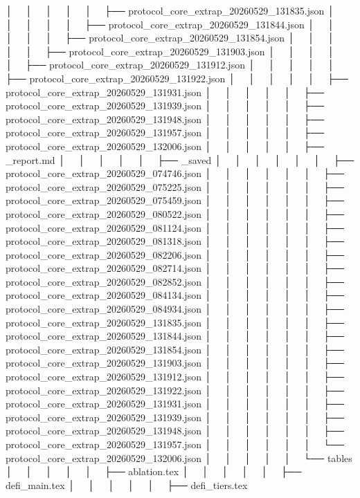 │   │       │   │   │   ├── protocol_core_extrap_20260529_131835.json
│   │       │   │   │   ├── protocol_core_extrap_20260529_131844.json
│   │       │   │   │   ├── protocol_core_extrap_20260529_131854.json
│   │       │   │   │   ├── protocol_core_extrap_20260529_131903.json
│   │       │   │   │   ├── protocol_core_extrap_20260529_131912.json
│   │       │   │   │   ├── protocol_core_extrap_20260529_131922.json
│   │       │   │   │   ├── protocol_core_extrap_20260529_131931.json
│   │       │   │   │   ├── protocol_core_extrap_20260529_131939.json
│   │       │   │   │   ├── protocol_core_extrap_20260529_131948.json
│   │       │   │   │   ├── protocol_core_extrap_20260529_131957.json
│   │       │   │   │   ├── protocol_core_extrap_20260529_132006.json
│   │       │   │   │   ├── _report.md
│   │       │   │   │   ├── _saved
│   │       │   │   │   │   ├── protocol_core_extrap_20260529_074746.json
│   │       │   │   │   │   ├── protocol_core_extrap_20260529_075225.json
│   │       │   │   │   │   ├── protocol_core_extrap_20260529_075459.json
│   │       │   │   │   │   ├── protocol_core_extrap_20260529_080522.json
│   │       │   │   │   │   ├── protocol_core_extrap_20260529_081124.json
│   │       │   │   │   │   ├── protocol_core_extrap_20260529_081318.json
│   │       │   │   │   │   ├── protocol_core_extrap_20260529_082206.json
│   │       │   │   │   │   ├── protocol_core_extrap_20260529_082714.json
│   │       │   │   │   │   ├── protocol_core_extrap_20260529_082852.json
│   │       │   │   │   │   ├── protocol_core_extrap_20260529_084134.json
│   │       │   │   │   │   ├── protocol_core_extrap_20260529_084934.json
│   │       │   │   │   │   ├── protocol_core_extrap_20260529_131835.json
│   │       │   │   │   │   ├── protocol_core_extrap_20260529_131844.json
│   │       │   │   │   │   ├── protocol_core_extrap_20260529_131854.json
│   │       │   │   │   │   ├── protocol_core_extrap_20260529_131903.json
│   │       │   │   │   │   ├── protocol_core_extrap_20260529_131912.json
│   │       │   │   │   │   ├── protocol_core_extrap_20260529_131922.json
│   │       │   │   │   │   ├── protocol_core_extrap_20260529_131931.json
│   │       │   │   │   │   ├── protocol_core_extrap_20260529_131939.json
│   │       │   │   │   │   ├── protocol_core_extrap_20260529_131948.json
│   │       │   │   │   │   ├── protocol_core_extrap_20260529_131957.json
│   │       │   │   │   │   └── protocol_core_extrap_20260529_132006.json
│   │       │   │   │   └── tables
│   │       │   │   │       ├── ablation.tex
│   │       │   │   │       ├── defi_main.tex
│   │       │   │   │       ├── defi_tiers.tex
